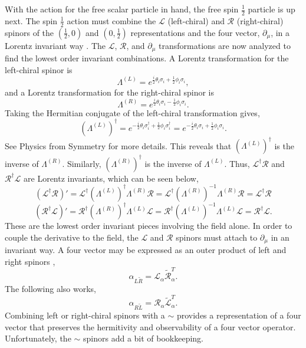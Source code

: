 With the action for the free scalar particle in hand, the free spin $\frac{1}{2}$ particle is up next. The spin $\frac{1}{2}$ action must combine the $\mathcal{L}$ (left-chiral) and $\mathcal{R}$ (right-chiral) spinors of the $(\frac{1}{2}, 0)$ and $(0, \frac{1}{2})$ representations and the four vector, $\partial_\mu$, in a Lorentz invariant way \cite{physymm}. The $\mathcal{L}$, $\mathcal{R}$, and $\partial_\mu$ transformations are now analyzed to find the lowest order invariant combinations. A Lorentz transformation for the left-chiral spinor is 
\begin{equation}
\Lambda^{(L)} = e^{\frac{i}{2}\theta_i \sigma_i + \frac{1}{2}\phi_i \sigma_i},
\end{equation}
and a Lorentz transformation for the right-chiral spinor is
\begin{equation}
\Lambda^{(R)} = e^{\frac{i}{2}\theta_i \sigma_i - \frac{1}{2}\phi_i \sigma_i}.
\end{equation}
Taking the Hermitian conjugate of the left-chiral transformation gives,
\begin{equation}
(\Lambda^{(L)})^\dagger = e^{-\frac{i}{2}\theta_i \sigma_i^\dagger + \frac{1}{2}\phi_i \sigma_i^\dagger} 
= e^{-\frac{i}{2}\theta_i \sigma_i + \frac{1}{2}\phi_i \sigma_i}.
\end{equation}
See Physics from Symmetry \cite{physymm} for more details. This reveals that $(\Lambda^{(L)})^\dagger$ is the inverse of $\Lambda^{(R)}$. Similarly, $(\Lambda^{(R)})^\dagger$ is the inverse of $\Lambda^{(L)}$. Thus, $\mathcal{L}^\dagger\mathcal{R}$ and $\mathcal{R}^\dagger\mathcal{L}$ are Lorentz invariants, which can be seen below,
\begin{equation}
(\mathcal{L}^\dagger\mathcal{R})' = \mathcal{L}^\dagger (\Lambda^{(L)})^\dagger \Lambda^{(R)} \mathcal{R} 
= \mathcal{L}^\dagger (\Lambda^{(R)})^{-1} \Lambda^{(R)} \mathcal{R} = \mathcal{L}^\dagger \mathcal{R}  
\end{equation}
\begin{equation}
(\mathcal{R}^\dagger\mathcal{L})' = \mathcal{R}^\dagger (\Lambda^{(R)})^\dagger \Lambda^{(L)} \mathcal{L} 
= \mathcal{R}^\dagger (\Lambda^{(L)})^{-1} \Lambda^{(L)} \mathcal{L} = \mathcal{R}^\dagger \mathcal{L}. 
\end{equation}
These are the lowest order invariant pieces involving the field alone. In order to couple the derivative to the field, the $\mathcal{L}$ and $\mathcal{R}$ spinors must attach to $\partial_\mu$ in an invariant way. A four vector may be expressed as an outer product of left and right spinors \cite{physymm}, 
\begin{equation}
\alpha_{L\tilde{R}} = \mathcal{L}_\alpha \tilde{\mathcal{R}}_\alpha^{T}.
\end{equation}
The following also works, 
\begin{equation}
\alpha_{R\tilde{L}} = \mathcal{R}_\alpha \tilde{\mathcal{L}}_\alpha^{T}.
\end{equation}
Combining left or right-chiral spinors with a $\sim$ provides a representation of a four vector that preserves the hermitivity and observability of a four vector operator. Unfortunately, the $\sim$ spinors add a bit of bookkeeping.

